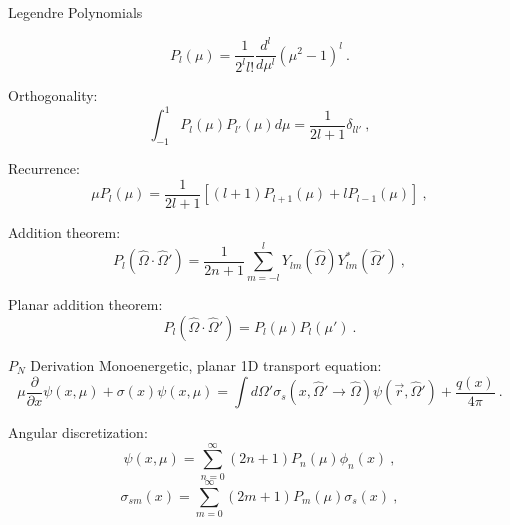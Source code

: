 \documentclass{beamer}
\begin{document}
\begin{frame}{Legendre Polynomials}

  \begin{equation}
    P_l(\mu) = \frac{1}{2^l l!}\frac{d^l}{d \mu^l}(\mu^2-1)^l\:.
    \label{eq:general_legendre_poly}
  \end{equation}

  Orthogonality:
  \begin{equation}
    \int_{-1}^{1} P_l(\mu) P_{l'}(\mu) d\mu = \frac{1}{2l+1}\delta_{l l'}\:,
    \label{eq:legendre_orthog}
  \end{equation}

  Recurrence:
  \begin{equation}
    \mu P_l(\mu) = \frac{1}{2l+1}[(l+1)P_{l+1}(\mu) + l P_{l-1}(\mu)]\:,
    \label{eq:legendre_recurrence}
  \end{equation}

  Addition theorem:
  \begin{equation}
    P_l(\hat{\Omega} \cdot \hat{\Omega}') = \frac{1}{2n+1}\sum_{m=-l}^l
    Y_{lm}(\hat{\Omega})Y^*_{lm}(\hat{\Omega}')\:,
    \label{eq:legendre_addition}
  \end{equation}

  Planar addition theorem:
  \begin{equation}
    P_l(\hat{\Omega} \cdot \hat{\Omega}') = P_l(\mu)P_l(\mu')\:.
    \label{eq:legendre_addition_3}
  \end{equation}

\end{frame}

\begin{frame}{$P_N$ Derivation}
  Monoenergetic, planar 1D transport equation:
  \begin{equation}
    \mu \frac{\partial}{\partial x} \psi(x,\mu) + \sigma(x) \psi(x,\mu)
    = \int d\Omega' \sigma_s(x,\hat{\Omega}' \rightarrow \hat{\Omega})
    \psi(\vec{r},\hat{\Omega}') + \frac{q(x)}{4 \pi}\:.
    \label{eq:mono_transport}
  \end{equation}

  Angular discretization:
  \begin{equation}
    \psi(x,\mu) = \sum_{n=0}^\infty (2n+1)P_n(\mu)\phi_n(x)\:,
    \label{eq:flux_expansion}
  \end{equation}
  \begin{equation}
    \sigma_{sm}(x) = \sum_{m=0}^\infty (2m+1)P_m(\mu)\sigma_s(x)\:,
    \label{eq:scattering_expansion}
  \end{equation}

\end{frame}
\end{document}
